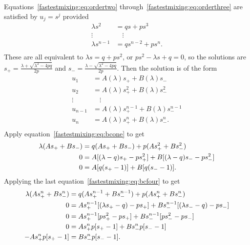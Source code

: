 \documentclass[12pt]{article}
\begin{document}
\begin{solution}
    Equations~\eqref{fastestmixing:eq:ordertwo} through~\eqref{fastestmixing:eq:orderthree}
    are satisfied by \( u_j = s^j \) provided
    \begin{align*}
        \lambda s^2 &= q s + p s^3 \\
        \vdots &\quad \vdots \\
        \lambda s^{n-1} &= q s^{n-2} + p s^n.  \\
    \end{align*}
    These are all equivalent to \( \lambda s = q + p s^2 \), or \( p s^2
    - \lambda s + q = 0 \), so the solutions are \( s_{+} = \frac{\lambda
    + \sqrt{\lambda^2 - 4pq}}{2p} \) and \( s_{-} = \frac{\lambda -
    \sqrt{\lambda^2 - 4pq}}{2p} \).  Then the solution is of the form
    \begin{align*}
        u_1 &= A(\lambda) s_{+} + B(\lambda) s_{-} \\
        u_2 &= A(\lambda) s_{+}^2 + B(\lambda) s_{-}^2 \\
        \vdots &\quad \vdots \\
        u_{n-1} &= A(\lambda) s_{+}^{n-1} + B(\lambda) s_{-}^{n-1} \\
        u_n &= A(\lambda) s_{+}^n + B(\lambda) s_{-}^n.  \\
    \end{align*}
    Apply equation~\eqref{fastestmixing:eq:bcone} to get
    \begin{align}
        \lambda (A s_{+} + B s_{-} ) &= q(A s_{+} + B s_{-}) + p(A s_{+}^2
        + B s_{-}^2 ) \notag \\
        0 &= A[(\lambda-q)s_{+} - p s_{+}^2] + B[(\lambda-q)s_{-} - p s_
        {-}^2] \notag \\
        0 &= A[q(s_{+} - 1)] + B[q(s_{-} -1)].%
        \label{fastestmixing:eq:leftrelation}
    \end{align}
    Applying the last equation~\eqref{fastestmixing:eq:bcfour} to get
    \begin{align}
        \lambda (A s_{+}^{n} + B s_{-}^{n} ) &= q(A s_{+}^{n-1} + B s_{-}^
        {n-1}) + p(A s_{+}^n + B s_{-}^n) \notag \\
        0 &= A s_{+}^{n-1} [(\lambda s_{+} - q) - p s_{+}] + B s_{-}^{n-1}
        [(\lambda s_{-}- q) - p s_{-}] \notag \\
        0 &= A s_{+}^{n-1} [p s_{+}^2 - p s_{+}] + B s_{-}^{n-1} [p s_{-}^2
        - p s_{-}] \notag \\
        0 &= A s_{+}^n p [s_{+} - 1] + B s_{-}^n p [s_{-} - 1]%
        \label{fastestmixing:eq:bcrelation} \\
        - A s_{+}^n p [ s_{+} - 1] &= B s_{-}^n p[ s_{-} - 1].
    \end{align}


\end{solution}
\end{document}
